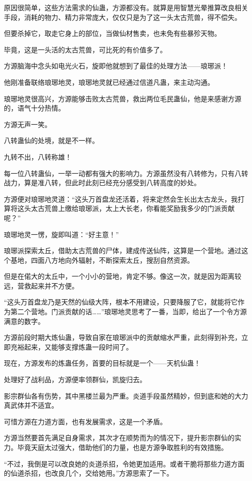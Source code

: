 \begin{this_body}
原因很简单，这些方法需求的仙蛊，方源都没有。就算是用智慧光晕推算改良相关手段，消耗的物力、精力非常庞大，仅仅只是为了这一头太古荒兽，得不偿失。

但要杀掉它，取走它身上的部位，当做仙材售卖，也未免有些暴殄天物。

毕竟，这是一头活的太古荒兽，可比死的有价值多了。

方源脑海中念头如电光火石，旋即他就想到了最佳的处理方法——琅琊派！

他刚准备联络琅琊地灵，琅琊地灵就已经通过信道凡蛊，来主动沟通。

琅琊地灵很高兴，方源能够击败太古荒兽，救出两位毛民蛊仙，他是来感谢方源的，语气十分热情。

方源无声一笑。

八转蛊仙的处境，就是不一样。

九转不出，八转称雄！

每一位八转蛊仙，一举一动都有强大的影响力。方源虽然没有八转修为，只有八转战力，算是准八转，但此时此刻已经充分感受到八转高度的妙处。

方源便对琅琊地灵道：“这头万首盘龙还活着，将来定然会生长出太古龙头，我打算将这头太古荒兽上缴给琅琊派，太上大长老，你看能奖励我多少的门派贡献呢？”

琅琊地灵一愣，旋即叫道：“好主意！”

琅琊派探索太丘，借助太古荒兽的尸体，建成传送仙阵，这算是一个营地。通过这个基地，四面八方地向外辐射，不断探索太丘，搜刮自然资源。

但是在偌大的太丘中，一个小小的营地，肯定不够。像这一次，就是因为距离较远，营救起来并不方便。

“这头万首盘龙乃是天然的仙级大阵，根本不用建设，只要降服了它，就能将它作为第二个营地。门派贡献的话……”琅琊地灵思考了一番，当即，给出了一个令方源满意的数字。

方源前段时期大炼仙蛊，导致自家在琅琊派中的贡献缩水严重，此刻得到补充，立即充裕起来，又能够支撑炼蛊一段时间了。

现在，方源发布的炼蛊任务，首要的目标就是一个——天机仙蛊！

处理好了战利品，方源便率领群仙，凯旋归去。

影宗群仙各有伤势，其中黑楼兰最为严重。炎道手段虽然精妙，但到底和她的大力真武体并不适宜。

可惜方源在力道方面，也有发展需求，这是一个矛盾。

方源当然要首先满足自身需求，其次才在顺势而为的情况下，提升影宗群仙的实力。毕竟天庭太过强大，借助他们的力量，也是方源争取胜利的有效措施。

“不过，我倒是可以改良她的炎道杀招，令她更加适用。或者干脆将那些力道方面的仙道杀招，也改良几个，交给她用。”方源思索了一下。


\end{this_body}
